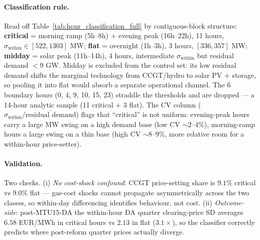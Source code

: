 \documentclass[11pt,a4paper]{article}
\begin{document}
\begin{table}[H]
\centering\footnotesize
\caption{\textbf{Hour-of-day classification metrics, Spain 2023--2026} (ENTSO-E A65 + A75, 15-min ISP, $n \approx 3.4$ years of daily observations per hour). The classifier is $\sigma_{\text{within}}$ (column 6, MW). Critical hours: $\sigma_{\text{within}} \in [522, 1303]$. Flat hours: $\sigma_{\text{within}} \in [336, 357]$. Midday: $\sigma_{\text{within}} \in [468, 502]$ --- intermediate, but excluded for the separate reason discussed below. Dropped (transition) hours sit at the regime boundaries. \textit{Year-stability:} across the 3 full years 2023, 2024, 2025 (computed separately), the critical-set min $\sigma_{\text{within}}$ across years is 530 MW, exceeding the flat-set max (387 MW) by $1.4\times$; no within-class swaps across years.}
\label{tab:hour_classification_full}
\newcommand{\critrow}{\rowcolor{red!10}}%
\newcommand{\flatrow}{\rowcolor{blue!10}}%

\end{table}

\paragraph{Classification rule.}
Read off Table~\ref{tab:hour_classification_full} by contiguous-block structure: \textbf{critical} = morning ramp (5h--8h) + evening peak (16h--22h), 11 hours, $\sigma_{\text{within}} \in [522, 1303]$ MW; \textbf{flat} = overnight (1h--3h), 3 hours, $[336, 357]$ MW; \textbf{midday} = solar peak (11h--14h), 4 hours, intermediate $\sigma_{\text{within}}$ but residual demand $< 9$ GW. Midday is excluded from the control set: its low residual demand shifts the marginal technology from CCGT/hydro to solar PV $+$ storage, so pooling it into flat would absorb a separate operational channel. The 6 boundary hours (0, 4, 9, 10, 15, 23) straddle the thresholds and are dropped --- a 14-hour analytic sample (11 critical $+$ 3 flat). The CV column ($\sigma_{\text{within}}/\overline{\text{residual demand}}$) flags that ``critical'' is not uniform: evening-peak hours carry a large MW swing on a high demand base (low CV $\sim 2$--$4\%$), morning-ramp hours a large swing on a thin base (high CV $\sim 8$--$9\%$, more relative room for a within-hour price-setter).

\paragraph{Validation.} Two checks. (i) \emph{No cost-shock confound}: CCGT price-setting share is $9.1\%$ critical vs $9.0\%$ flat --- gas-cost shocks cannot propagate asymmetrically across the two classes, so within-day differencing identifies behaviour, not cost. (ii) \emph{Outcome-side}: post-MTU15-DA the within-hour DA quarter clearing-price SD averages $6.58$ EUR/MWh in critical hours vs $2.13$ in flat ($3.1\times$), so the classifier correctly predicts where post-reform quarter prices actually diverge.
\end{document}
